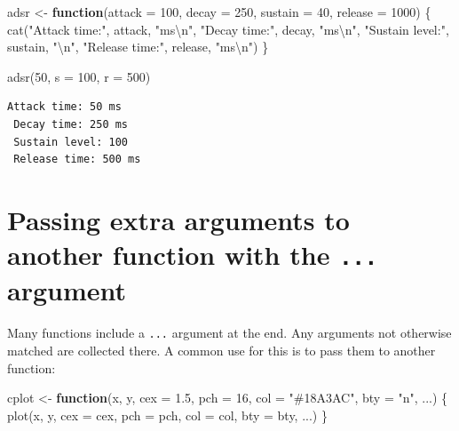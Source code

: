 \documentclass[
]{book}
\newenvironment{Shaded}{\begin{snugshade}}{\end{snugshade}}
\newcommand{\AttributeTok}[1]{\textcolor[rgb]{0.77,0.63,0.00}{#1}}
\newcommand{\ControlFlowTok}[1]{\textcolor[rgb]{0.13,0.29,0.53}{\textbf{#1}}}
\newcommand{\DecValTok}[1]{\textcolor[rgb]{0.00,0.00,0.81}{#1}}
\newcommand{\FloatTok}[1]{\textcolor[rgb]{0.00,0.00,0.81}{#1}}
\newcommand{\FunctionTok}[1]{\textcolor[rgb]{0.00,0.00,0.00}{#1}}
\newcommand{\NormalTok}[1]{#1}
\newcommand{\OtherTok}[1]{\textcolor[rgb]{0.56,0.35,0.01}{#1}}
\newcommand{\SpecialCharTok}[1]{\textcolor[rgb]{0.00,0.00,0.00}{#1}}
\newcommand{\StringTok}[1]{\textcolor[rgb]{0.31,0.60,0.02}{#1}}
\begin{document}
\begin{Shaded}
\begin{Highlighting}[]
\NormalTok{adsr }\OtherTok{\textless{}{-}} \ControlFlowTok{function}\NormalTok{(}\AttributeTok{attack =} \DecValTok{100}\NormalTok{,}
                 \AttributeTok{decay =} \DecValTok{250}\NormalTok{,}
                 \AttributeTok{sustain =} \DecValTok{40}\NormalTok{,}
                 \AttributeTok{release =} \DecValTok{1000}\NormalTok{) \{}
  \FunctionTok{cat}\NormalTok{(}\StringTok{"Attack time:"}\NormalTok{, attack, }\StringTok{"ms}\SpecialCharTok{\textbackslash{}n}\StringTok{"}\NormalTok{,}
      \StringTok{"Decay time:"}\NormalTok{, decay, }\StringTok{"ms}\SpecialCharTok{\textbackslash{}n}\StringTok{"}\NormalTok{,}
      \StringTok{"Sustain level:"}\NormalTok{, sustain, }\StringTok{"}\SpecialCharTok{\textbackslash{}n}\StringTok{"}\NormalTok{,}
      \StringTok{"Release time:"}\NormalTok{, release, }\StringTok{"ms}\SpecialCharTok{\textbackslash{}n}\StringTok{"}\NormalTok{)}
\NormalTok{\}}

\FunctionTok{adsr}\NormalTok{(}\DecValTok{50}\NormalTok{, }\AttributeTok{s =} \DecValTok{100}\NormalTok{, }\AttributeTok{r =} \DecValTok{500}\NormalTok{)}
\end{Highlighting}
\end{Shaded}

\begin{verbatim}
Attack time: 50 ms
 Decay time: 250 ms
 Sustain level: 100 
 Release time: 500 ms
\end{verbatim}

\hypertarget{passing-extra-arguments-to-another-function-with-the-...-argument}{%
\section{\texorpdfstring{Passing extra arguments to another function with the \texttt{...} argument}{Passing extra arguments to another function with the ... argument}}\label{passing-extra-arguments-to-another-function-with-the-...-argument}}

Many functions include a \texttt{...} argument at the end. Any arguments not otherwise matched are collected there. A common use for this is to pass them to another function:

\begin{Shaded}
\begin{Highlighting}[]
\NormalTok{cplot }\OtherTok{\textless{}{-}} \ControlFlowTok{function}\NormalTok{(x, y,}
                  \AttributeTok{cex =} \FloatTok{1.5}\NormalTok{,}
                  \AttributeTok{pch =} \DecValTok{16}\NormalTok{,}
                  \AttributeTok{col =} \StringTok{"\#18A3AC"}\NormalTok{,}
                  \AttributeTok{bty =} \StringTok{"n"}\NormalTok{, ...) \{}
  \FunctionTok{plot}\NormalTok{(x, y, }\AttributeTok{cex =}\NormalTok{ cex, }\AttributeTok{pch =}\NormalTok{ pch, }\AttributeTok{col =}\NormalTok{ col, }\AttributeTok{bty =}\NormalTok{ bty, ...)}
\NormalTok{                  \}}
\end{Highlighting}
\end{Shaded}
\end{document}
